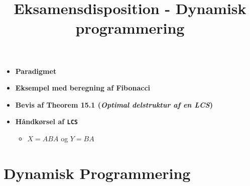 
\title{Eksamensdisposition - Dynamisk programmering}

\maketitle


\begin{itemize}
\item \textbf{Paradigmet}
\item \textbf{Eksempel med beregning af Fibonacci}
\item \textbf{Bevis af Theorem 15.1 (\textit{Optimal delstruktur af en LCS})}
\item \textbf{Håndkørsel af \texttt{LCS}}
\begin{itemize}
	\item $X = ABA$ og $Y = BA$
\end{itemize}

\end{itemize}




\newpage
\section{Dynamisk Programmering}



